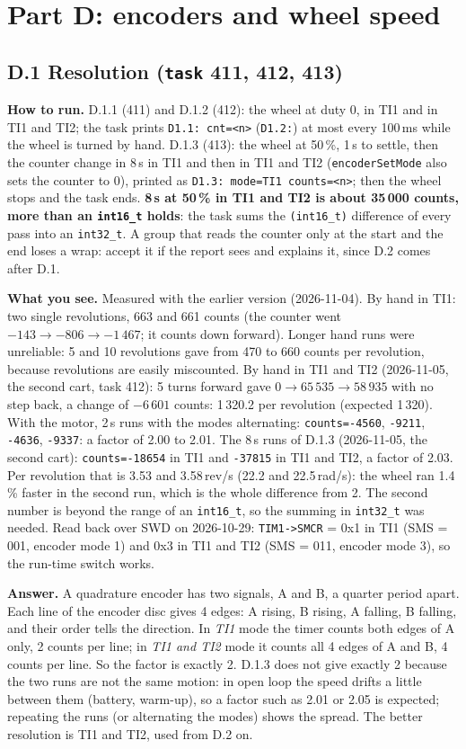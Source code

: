 \documentclass[11pt,a4paper]{article}
\newcommand{\lv}[1]{\texttt{#1}}                 %
\newcommand{\run}[1]{\textbf{How to run.} #1}
\newcommand{\see}[1]{\textbf{What you see.} #1}
\begin{document}
\section{Part D: encoders and wheel speed}

\subsection*{D.1 Resolution (\lv{task} 411, 412, 413)}
\run{D.1.1 (411) and D.1.2 (412): the wheel at duty 0, in TI1 and in TI1 and TI2; the task prints
\texttt{D1.1: cnt=<n>} (\texttt{D1.2:}) at most every 100\,ms while the wheel is turned by hand. D.1.3 (413): the
wheel at 50\,\%, 1\,s to settle, then the counter change in 8\,s in TI1 and then in TI1 and TI2
(\texttt{encoderSetMode} also sets the counter to 0), printed as \texttt{D1.3: mode=TI1 counts=<n>}; then the wheel
stops and the task ends. \textbf{8\,s at 50\,\% in TI1 and TI2 is about 35\,000 counts, more than an
\texttt{int16\_t} holds}: the task sums the \texttt{(int16\_t)} difference of every pass into an \texttt{int32\_t}. A
group that reads the counter only at the start and the end loses a wrap: accept it if the report sees and explains
it, since D.2 comes after D.1.}

\see{Measured with the earlier version (2026-11-04). By hand in TI1: two single revolutions, 663 and 661 counts (the
counter went $-143 \to -806 \to -1\,467$; it counts down forward). Longer hand runs were unreliable: 5 and 10
revolutions gave from 470 to 660 counts per revolution, because revolutions are easily miscounted. By hand in TI1 and TI2 (2026-11-05, the second cart, task 412): 5 turns forward gave
$0 \to 65\,535 \to 58\,935$ with no step back, a change of $-6\,601$ counts: 1\,320.2 per revolution
(expected 1\,320). With the motor, 2\,s runs with the modes alternating: \texttt{counts=-4560},
\texttt{-9211}, \texttt{-4636}, \texttt{-9337}: a factor of 2.00 to 2.01. The 8\,s runs of D.1.3 (2026-11-05, the second cart): \texttt{counts=-18654} in TI1 and
\texttt{-37815} in TI1 and TI2, a factor of 2.03. Per revolution that is 3.53 and 3.58\,rev/s (22.2 and
22.5\,rad/s): the wheel ran 1.4\,\% faster in the second run, which is the whole difference from 2. The
second number is beyond the range of an \texttt{int16\_t}, so the summing in \texttt{int32\_t} was needed. Read back over
SWD on 2026-10-29: \texttt{TIM1->SMCR} = 0x1 in TI1 (SMS = 001, encoder mode 1) and 0x3 in TI1 and TI2 (SMS = 011,
encoder mode 3), so the run-time switch works.}

\textbf{Answer.} A quadrature encoder has two signals, A and B, a quarter period apart. Each line of the encoder
disc gives 4 edges: A rising, B rising, A falling, B falling, and their order tells the direction. In \emph{TI1} mode
the timer counts both edges of A only, 2 counts per line; in \emph{TI1 and TI2} mode it counts all 4 edges of A and B,
4 counts per line. So the factor is exactly 2. D.1.3 does not give exactly 2 because the two runs are not the same
motion: in open loop the speed drifts a little between them (battery, warm-up), so a factor such as 2.01 or 2.05 is
expected; repeating the runs (or alternating the modes) shows the spread. The better resolution is TI1 and TI2, used
from D.2 on.
\end{document}
